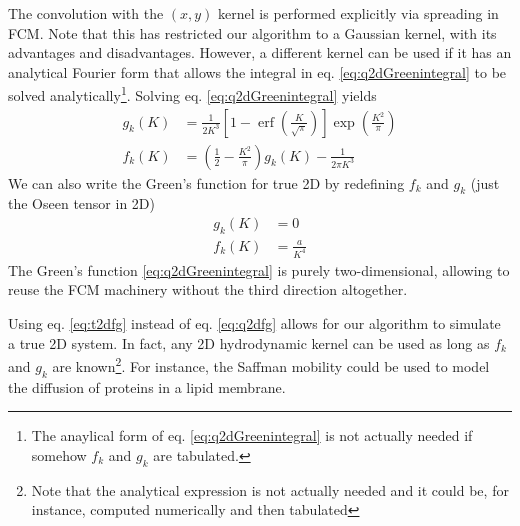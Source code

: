 \documentclass[ twoside,openright,titlepage,numbers=noenddot,%
headinclude,footinclude,cleardoublepage=empty,abstract=on,
BCOR=5mm,paper=a4,fontsize=11pt, dvipsnames
]{scrreprt}
\DeclareMathOperator{\erf}{erf}
\begin{document}
The convolution with the $(x,y)$ kernel is performed explicitly via spreading in \gls{FCM}.
Note that this has restricted our algorithm to a Gaussian kernel, with its advantages and disadvantages. However, a different kernel can be used if it has an analytical Fourier form that allows the integral in eq. \eqref{eq:q2dGreenintegral} to be solved analytically\footnote{The anaylical form of eq. \eqref{eq:q2dGreenintegral} is not actually needed if somehow $f_k$ and $g_k$ are tabulated.}.
Solving eq. \eqref{eq:q2dGreenintegral} yields
\begin{equation}
  \label{eq:q2dfg}
  \begin{aligned}
    g_{k}\left(K\right) & = \frac{1}{2K^3}\left[1-{\erf}\left(\frac{K}{\sqrt{\pi}}\right)\right]\exp\left(\frac{K^2}{\pi}\right)\\
    f_{k}\left(K\right) & = \left(\frac{1}{2} - \frac{K^{2}}{\pi}\right)g_k(K) - \frac{1}{2\pi K^3}
  \end{aligned}  
\end{equation}
We can also write the Green's function for true 2D by redefining $f_k$ and $g_k$ (just the Oseen tensor in 2D)
\begin{equation}
  \label{eq:t2dfg}
  \begin{aligned}
    g_{k}\left(K\right) & = 0\\
    f_{k}\left(K\right) & = \frac{a}{K^4}
  \end{aligned}  
\end{equation}
The Green's function \eqref{eq:q2dGreenintegral} is purely two-dimensional, allowing to reuse the \gls{FCM} machinery without the third direction altogether.


Using eq. \eqref{eq:t2dfg} instead of eq. \eqref{eq:q2dfg} allows for our algorithm to simulate a true 2D system. In fact, any 2D hydrodynamic kernel can be used as long as $f_k$ and $g_k$ are known\footnote{Note that the analytical expression is not actually needed and it could be, for instance, computed numerically and then tabulated}. For instance, the Saffman mobility could be used to model the diffusion of proteins in a lipid membrane\cite{Saffman}.
\end{document}
